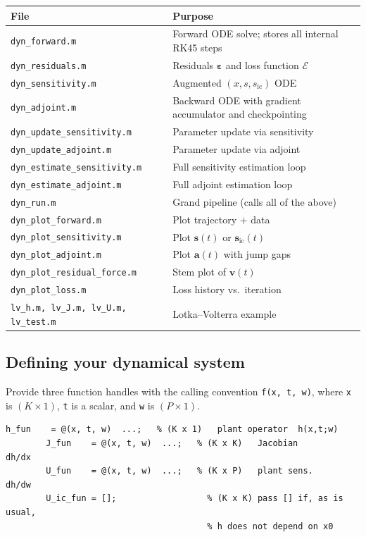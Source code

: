 \documentclass[10pt]{article}
\begin{document}
	\medskip
	\noindent
	\begin{tabular}{@{}L{5.8cm}L{9.5cm}@{}}
		\toprule
		File & Purpose \\
		\midrule
		\texttt{dyn\_forward.m}            & Forward ODE solve; stores all internal RK45 steps \\
		\texttt{dyn\_residuals.m}          & Residuals $\boldsymbol{\varepsilon}$ and loss function $\mathcal{E}$ \\
		\texttt{dyn\_sensitivity.m}        & Augmented $(x,s,s_\mathrm{ic})$ ODE \\
		\texttt{dyn\_adjoint.m}            & Backward ODE with gradient accumulator and checkpointing \\
		\texttt{dyn\_update\_sensitivity.m}& Parameter update via sensitivity \\
		\texttt{dyn\_update\_adjoint.m}    & Parameter update via adjoint \\
		\texttt{dyn\_estimate\_sensitivity.m} & Full sensitivity estimation loop \\
		\texttt{dyn\_estimate\_adjoint.m}  & Full adjoint estimation loop \\
		\texttt{dyn\_run.m}                & Grand pipeline (calls all of the above) \\
		\texttt{dyn\_plot\_forward.m}      & Plot trajectory $+$ data \\
		\texttt{dyn\_plot\_sensitivity.m}  & Plot $\mathbf{s}(t)$ or $\mathbf{s}_\mathrm{ic}(t)$ \\
		\texttt{dyn\_plot\_adjoint.m}      & Plot $\mathbf{a}(t)$ with jump gaps \\
		\texttt{dyn\_plot\_residual\_force.m} & Stem plot of $\mathbf{v}(t)$ \\
		\texttt{dyn\_plot\_loss.m}         & Loss history vs.\ iteration \\
		\texttt{lv\_h.m, lv\_J.m, lv\_U.m, lv\_test.m} & Lotka--Volterra example \\
		\bottomrule
	\end{tabular}
	
	\subsection{Defining your dynamical system}
	
	Provide three function handles with the calling convention
	\texttt{f(x,\,t,\,w)}, where \texttt{x} is $(K{\times}1)$,
	\texttt{t} is a scalar, and \texttt{w} is $(P{\times}1)$.
	
	\begin{lstlisting}[style=matlab]
		h_fun    = @(x, t, w)  ...;   % (K x 1)   plant operator  h(x,t;w)
		J_fun    = @(x, t, w)  ...;   % (K x K)   Jacobian        dh/dx
		U_fun    = @(x, t, w)  ...;   % (K x P)   plant sens.     dh/dw
		U_ic_fun = [];                  % (K x K) pass [] if, as is usual, 
		                                % h does not depend on x0
	\end{lstlisting}
	
\end{document}
